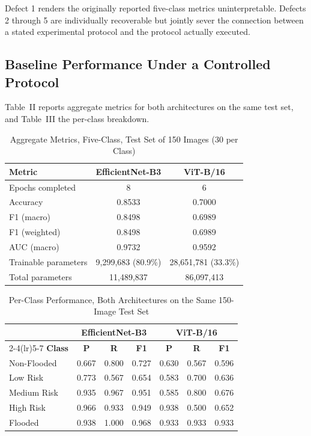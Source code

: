 \documentclass[11pt,journal]{IEEEtran}
\begin{document}
Defect 1 renders the originally reported five-class metrics uninterpretable.
Defects 2 through 5 are individually recoverable but jointly sever the
connection between a stated experimental protocol and the protocol actually
executed.

\subsection{Baseline Performance Under a Controlled Protocol}

Table~II reports aggregate metrics for both architectures on the same test
set, and Table~III the per-class breakdown.

\begin{table}[!t]
\caption{Aggregate Metrics, Five-Class, Test Set of 150 Images (30 per Class)}
\label{tab:aggregate}
\centering
\begin{tabular}{@{}lcc@{}}
\toprule
\textbf{Metric} & \textbf{EfficientNet-B3} & \textbf{ViT-B/16} \\
\midrule
Epochs completed    & 8    & 6    \\
Accuracy            & 0.8533 & 0.7000 \\
F1 (macro)          & 0.8498 & 0.6989 \\
F1 (weighted)       & 0.8498 & 0.6989 \\
AUC (macro)         & 0.9732 & 0.9592 \\
Trainable parameters & 9,299,683 (80.9\%) & 28,651,781 (33.3\%) \\
Total parameters    & 11,489,837 & 86,097,413 \\
\bottomrule
\end{tabular}
\end{table}

\begin{table}[!t]
\caption{Per-Class Performance, Both Architectures on the Same 150-Image Test Set}
\label{tab:perclass}
\centering
\begin{tabular}{@{}lcccccc@{}}
\toprule
& \multicolumn{3}{c}{\textbf{EfficientNet-B3}} & \multicolumn{3}{c}{\textbf{ViT-B/16}} \\
\cmidrule(lr){2-4}\cmidrule(lr){5-7}
\textbf{Class} & \textbf{P} & \textbf{R} & \textbf{F1} & \textbf{P} & \textbf{R} & \textbf{F1} \\
\midrule
Non-Flooded  & 0.667 & 0.800 & 0.727 & 0.630 & 0.567 & 0.596 \\
Low Risk     & 0.773 & 0.567 & 0.654 & 0.583 & 0.700 & 0.636 \\
Medium Risk  & 0.935 & 0.967 & 0.951 & 0.585 & 0.800 & 0.676 \\
High Risk    & 0.966 & 0.933 & 0.949 & 0.938 & 0.500 & 0.652 \\
Flooded      & 0.938 & 1.000 & 0.968 & 0.933 & 0.933 & 0.933 \\
\bottomrule
\end{tabular}
\end{table}
\end{document}
